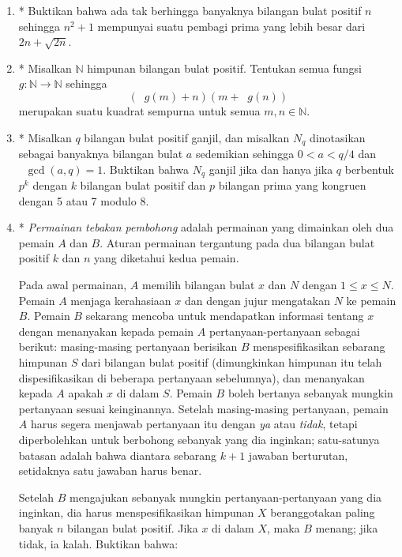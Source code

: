 \documentclass[12pt]{article}
\newcommand*\func[2]{\mathop{}\!{#1}{\left({#2}\right)}}
\begin{document}
\begin{enumerate}[leftmargin=*]
		\item* Buktikan bahwa ada tak berhingga banyaknya bilangan bulat positif $ n $ sehingga $ n^{2} + 1 $ mempunyai suatu pembagi prima yang lebih besar dari $ 2n + \sqrt{2n} $.
		\item* Misalkan $ \mathbb{N} $ himpunan bilangan bulat positif. Tentukan semua fungsi $ g : \mathbb{N} \to \mathbb{N} $ sehingga
		\[ \left(\func{g}{m} + n\right)\left(m + \func{g}{n}\right) \]
		merupakan suatu kuadrat sempurna untuk semua $ m, n \in \mathbb{N} $.
		\item* Misalkan $ q $ bilangan bulat positif ganjil, dan misalkan $ N_{q} $ dinotasikan sebagai banyaknya bilangan bulat $ a $ sedemikian sehingga $ 0 < a < q/4 $ dan $ \func{\gcd}{a, q} = 1 $. Buktikan bahwa $ N_{q} $ ganjil jika dan hanya jika $ q $ berbentuk $ p^{k} $ dengan $ k $ bilangan bulat positif dan $ p $ bilangan prima yang kongruen dengan 5 atau 7 modulo 8.
		\item* \textit{Permainan tebakan pembohong} adalah permainan yang dimainkan oleh dua pemain $ A $ dan $ B $. Aturan permainan tergantung pada dua bilangan bulat positif $ k $ dan $ n $ yang diketahui kedua pemain.
		\par \noindent Pada awal permainan, $ A $ memilih bilangan bulat $ x $ dan $ N $ dengan $ 1 \leq x \leq N $. Pemain $ A $ menjaga kerahasiaan $ x $ dan dengan jujur mengatakan $ N $ ke pemain $ B $. Pemain $ B $ sekarang mencoba untuk mendapatkan informasi tentang $ x $ dengan menanyakan kepada pemain $ A $ pertanyaan-pertanyaan sebagai berikut: masing-masing pertanyaan berisikan $ B $ menspesifikasikan sebarang himpunan $ S $ dari bilangan bulat positif (dimungkinkan himpunan itu telah dispesifikasikan di beberapa pertanyaan sebelumnya), dan menanyakan kepada $ A $ apakah $ x $ di dalam $ S $. Pemain $ B $ boleh bertanya sebanyak mungkin pertanyaan sesuai keinginannya. Setelah masing-masing pertanyaan, pemain $ A $ harus segera menjawab pertanyaan itu dengan \textit{ya} atau \textit{tidak}, tetapi diperbolehkan untuk berbohong sebanyak yang dia inginkan; satu-satunya batasan adalah bahwa diantara sebarang $ k + 1 $ jawaban berturutan, setidaknya satu jawaban harus benar.
		\par \noindent Setelah $ B $ mengajukan sebanyak mungkin pertanyaan-pertanyaan yang dia inginkan, dia harus menspesifikasikan himpunan $ X $ beranggotakan paling banyak $ n $ bilangan bulat positif. Jika $ x $ di dalam $ X $, maka $ B $ menang; jika tidak, ia kalah. Buktikan bahwa:
		\begin{enumerate}

\end{enumerate}
\end{enumerate}
\end{document}
